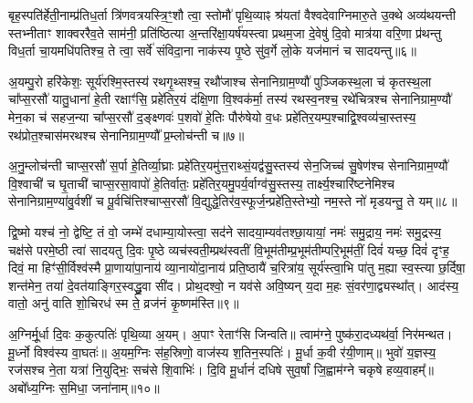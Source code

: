 बृह॒स्पति॑र्\mbox{}हेती॒नाम्प्र॑तिध॒र्ता त्रि॑णवत्रयस्त्रि॒ꣳ॒शौ त्वा॒ स्तोमौ॑ पृथि॒व्याꣴ श्र॑यतां वैश्वदेवाग्निमारु॒ते उ॒क्थे अव्य॑थयन्ती स्तभ्नीताꣳ शाक्वररैव॒ते साम॑नी॒ प्रति॑ष्ठित्या अ॒न्तरि॑क्षा॒यर्\mbox{}ष॑यस्त्वा प्रथम॒जा दे॒वेषु॑ दि॒वो मात्र॑या वरि॒णा प्र॑थन्तु विध॒र्ता चा॒यमधि॑पतिश्च॒ ते त्वा॒ सर्वे॑ संविदा॒ना नाक॑स्य पृ॒ष्ठे सु॑व॒र्गे लो॒के यज॑मानं च सादयन्तु॥६॥

{\anuvakamend[{प्र॒तीची॒ दिङ्म॒रुत॑स्ते दे॒वा अधि॑पतयश्चत्वारि॒ꣳ॒शच्च॑॥२॥}]}

अ॒यम्पु॒रो हरि॑केशः॒ सूर्य॑रश्मि॒स्तस्य॑ रथगृ॒थ्सश्च॒ रथौ॑जाश्च सेनानिग्राम॒ण्यौ॑ पुञ्जिकस्थ॒ला च॑ कृतस्थ॒ला चा᳚प्स॒रसौ॑ यातु॒धाना॑ हे॒ती रक्षाꣳ॑सि॒ प्रहे॑तिर॒यं द॑क्षि॒णा वि॒श्वक॑र्मा॒ तस्य॑ रथस्व॒नश्च॒ रथे॑चित्रश्च सेनानिग्राम॒ण्यौ॑ मेन॒का च॑ सहज॒न्या चा᳚प्स॒रसौ॑ द॒ङ्क्ष्णवः॑ प॒शवो॑ हे॒तिः पौरु॑षेयो व॒धः प्रहे॑तिर॒यम्प॒श्चाद्वि॒श्वव्य॑चा॒स्तस्य॒ रथ॑प्रोत॒श्चास॑मरथश्च सेनानिग्राम॒ण्यौ᳚ प्र॒म्लोच॑न्ती च॥७॥

अ॒नु॒म्लोच॑न्ती चाप्स॒रसौ॑ स॒र्पा हे॒तिर्व्या॒घ्राः प्रहे॑तिर॒यमु॑त्त॒राथ्सं॒यद्व॑सु॒स्तस्य॑ सेन॒जिच्च॑ सु॒षेण॑श्च सेनानिग्राम॒ण्यौ॑ वि॒श्वाची॑ च घृ॒ताची॑ चाप्स॒रसा॒वापो॑ हे॒तिर्वातः॒ प्रहे॑तिर॒यमु॒पर्य॒र्वाग्व॑सु॒स्तस्य॒ तार्क्ष्य॒श्चारि॑ष्टनेमिश्च सेनानिग्राम॒ण्या॑\-वु॒र्वशी॑ च पू॒र्वचि॑त्तिश्चाप्स॒रसौ॑ वि॒द्युद्धे॒तिर॑व॒स्फूर्ज॒न्प्रहे॑ति॒स्तेभ्यो॒ नम॒स्ते नो॑ मृडयन्तु॒ ते यम्॥८॥

द्वि॒ष्मो यश्च॑ नो॒ द्वेष्टि॒ तं वो॒ जम्भे॑ दधाम्या॒योस्त्वा॒ सद॑ने सादया॒म्यव॑तश्छा॒यायां॒ नमः॑ समु॒द्राय॒ नमः॑ समु॒द्रस्य॒ चक्ष॑से परमे॒ष्ठी त्वा॑ सादयतु दि॒वः पृ॒ष्ठे व्यच॑स्वती॒म्प्रथ॑स्वतीं वि॒भूम॑तीम्प्र॒भूम॑तीम्परि॒भूम॑तीं॒ दिवं॑ यच्छ॒ दिवं॑ दृꣳह॒ दिवं॒ मा हिꣳ॑सी॒र्विश्व॑स्मै प्रा॒णाया॑पा॒नाय॑ व्या॒नायो॑दा॒नाय॑ प्रति॒ष्ठायै॑ च॒रित्रा॑य॒ सूर्य॑स्त्वा॒भि पा॑तु म॒ह्या स्व॒स्त्या छ॒र्दिषा॒ शन्त॑मेन॒ तया॑ दे॒वत॑याङ्गिर॒स्वद्ध्रु॒वा सी॑द। प्रोथ॒दश्वो॒ न यव॑से अवि॒ष्यन् य॒दा म॒हः सं॒वर॑णा॒द्व्यस्था᳚त्। आद॑स्य॒ वातो॒ अनु॑ वाति शो॒चिरध॑ स्म ते॒ व्रज॑नं कृ॒ष्णम॑स्ति॥९॥

{\anuvakamend[{प्र॒म्लोच॑न्ती च॒ यꣴ स्व॒स्त्याष्टाविꣳ॑शतिश्च॥३॥}]}

अ॒ग्निर्मू॒र्धा दि॒वः क॒कुत्पतिः॑ पृथि॒व्या अ॒यम्। अ॒पाꣳ रेताꣳ॑सि जिन्वति॥ त्वाम॑ग्ने॒ पुष्क॑रा॒दध्यथ॑र्वा॒ निर॑मन्थत। मू॒र्ध्नो विश्व॑स्य वा॒घतः॑॥ अ॒यम॒ग्निः स॑ह॒स्रिणो॒ वाज॑स्य श॒तिन॒स्पतिः॑। मू॒र्धा क॒वी र॑यी॒णाम्॥ भुवो॑ य॒ज्ञस्य॒ रज॑सश्च ने॒ता यत्रा॑ नि॒युद्भिः॒ सच॑से शि॒वाभिः॑। दि॒वि मू॒र्धानं॑ दधिषे सुव॒र्\mbox{}षां जि॒ह्वाम॑ग्ने चकृषे हव्य॒वाहम्᳚॥ अबो᳚ध्य॒ग्निः स॒मिधा॒ जना॑नाम्॥१०॥

